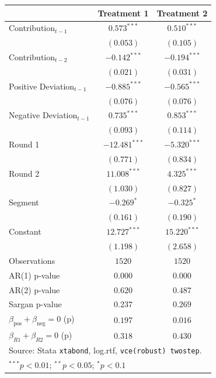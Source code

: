 
\begin{tabular}{l c c}
\toprule
 & Treatment 1 & Treatment 2 \\
\midrule
Contribution$_{t-1}$                              & $0.573^{***}$   & $0.510^{***}$  \\
                                                  & $(0.053)$       & $(0.105)$      \\
Contribution$_{t-2}$                              & $-0.142^{***}$  & $-0.194^{***}$ \\
                                                  & $(0.021)$       & $(0.031)$      \\
Positive Deviation$_{t-1}$                        & $-0.885^{***}$  & $-0.565^{***}$ \\
                                                  & $(0.076)$       & $(0.076)$      \\
Negative Deviation$_{t-1}$                        & $0.735^{***}$   & $0.853^{***}$  \\
                                                  & $(0.093)$       & $(0.114)$      \\
Round 1                                           & $-12.481^{***}$ & $-5.320^{***}$ \\
                                                  & $(0.771)$       & $(0.834)$      \\
Round 2                                           & $11.008^{***}$  & $4.325^{***}$  \\
                                                  & $(1.030)$       & $(0.827)$      \\
Segment                                           & $-0.269^{*}$    & $-0.325^{*}$   \\
                                                  & $(0.161)$       & $(0.190)$      \\
Constant                                          & $12.727^{***}$  & $15.220^{***}$ \\
                                                  & $(1.198)$       & $(2.658)$      \\
\midrule
Observations                                      & $1520$          & $1520$         \\
AR(1) p-value                                     & $0.000$         & $0.000$        \\
AR(2) p-value                                     & $0.620$         & $0.487$        \\
Sargan p-value                                    & $0.237$         & $0.269$        \\
$\beta_{\text{pos}} + \beta_{\text{neg}} = 0$ (p) & $0.197$         & $0.016$        \\
$\beta_{R1} + \beta_{R2} = 0$ (p)                 & $0.318$         & $0.430$        \\
\bottomrule
\multicolumn{3}{l}{\scriptsize{Source: Stata \texttt{xtabond}, log.rtf, \texttt{vce(robust) twostep}.}} \\
\multicolumn{3}{l}{\scriptsize{$^{***}p<0.01$; $^{**}p<0.05$; $^{*}p<0.1$}}
\end{tabular}
